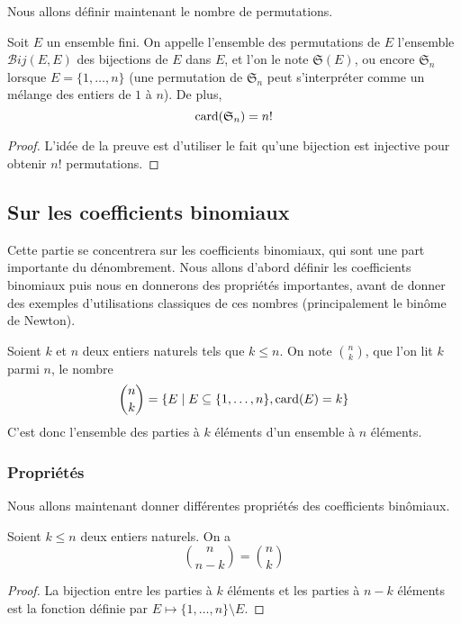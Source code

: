 Nous allons définir maintenant le nombre de permutations.

\begin{defi}[Permutation]
    Soit $E$ un ensemble fini. On appelle l'ensemble des permutations de $E$ l'ensemble $\mathcal{B}ij(E,E)$ des bijections de $E$ dans $E$, et l'on le note $\mathfrak S(E)$, ou encore $\mathfrak S_n$ lorsque $E=\{1,\ldots,n\}$ (une permutation de $\mathfrak S_n$ peut s'interpréter comme un mélange des entiers de $1$ à $n$). De plus, $$\mathrm{card}(\mathfrak S_n) = n!$$
\end{defi}
\begin{proof}
    L'idée de la preuve est d'utiliser le fait qu'une bijection est injective pour obtenir $n!$ permutations.
\end{proof}

\subsection{Sur les coefficients binomiaux}

Cette partie se concentrera sur les coefficients binomiaux, qui sont une part importante du dénombrement. Nous allons d'abord définir les coefficients binomiaux puis nous en donnerons des propriétés importantes, avant de donner des exemples d'utilisations classiques de ces nombres (principalement le binôme de Newton).

\begin{defi}
    Soient $k$ et $n$ deux entiers naturels tels que $k\leq n$. On note $\binom{n}{k}$, que l'on lit $k$ parmi $n$, le nombre $$\binom{n}{k} = \{E\;|\;E\subseteq \{1,\ldots,n\}, \mathrm{card}(E) = k\}$$ C'est donc l'ensemble des parties à $k$ éléments d'un ensemble à $n$ éléments.
\end{defi}

\subsubsection{Propriétés}

Nous allons maintenant donner différentes propriétés des coefficients binômiaux.

\begin{prop}
    Soient $k\leq n$ deux entiers naturels. On a $$\binom{n}{n-k}=\binom{n}{k}$$
\end{prop}
\begin{proof}
    La bijection entre les parties à $k$ éléments et les parties à $n-k$ éléments est la fonction définie par $E \mapsto \{1,\ldots,n\}\setminus E$.
\end{proof}

